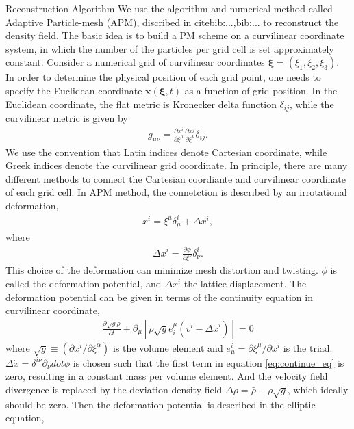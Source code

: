 \begin{section}{Reconstruction Algorithm}
  \label{sec:reconstruction}
    We use the algorithm and numerical method called Adaptive Particle-mesh (APM), discribed in citebib:...,bib:... to reconstruct the density field. The basic idea is to build a PM scheme on a curvilinear coordinate system, in which the number of the particles per grid cell is set approximately constant. 
    Consider a numerical grid of curvilinear coordinates $\bm{\xi}=\left(\xi_1,\xi_2,\xi_3\right)$. In order to determine the physical position of each grid point, one needs to specify the Euclidean coordinate $\bm{x}(\bm{\xi},t)$ as a function of grid position. In the Euclidean coordinate, the flat metric is Kronecker delta function $\delta_{ij}$, while the curvilinear metric is given by
\begin{align}
    g_{\mu\nu}=\frac{\partial x^i}{\partial \xi ^\mu} \frac{\partial x^j}{\partial \xi ^\nu}\delta_{ij}.
\end{align}
    We use the convention that Latin indices denote Cartesian coordinate, while Greek indices denote the curvilinear grid coordinate.
    In principle, there are many different methods to connect the Cartesian coordiante and curvilinear coordinate of each grid cell. In APM method, the connetction is described by an irrotational deformation,
\begin{align}
    x^i=\xi ^\mu \delta ^i _\mu + \Delta x^i,
\end{align}
where
\begin{align}
 \label{eq:disp}
    \Delta x^i=\frac{\partial \phi}{\partial \xi ^ \nu}\delta ^i _\nu .
\end{align}
    This choice of the deformation can minimize mesh distortion and twisting. $\phi$ is called the deformation potential, and $\Delta x^i$ the lattice displacement. The deformation potential can be given in terms of the continuity equation in curvilinear coordinate,
\begin{align}
 \label{eq:continue_eq}
    \frac{\partial \sqrt{g} \rho }{\partial t}+\partial_\mu \left[\rho \sqrt{g} e^\mu _i \left(v^i - \Delta \dot{x}^i \right) \right] =0
\end{align}
where $\sqrt{g} \equiv (\partial x^i / \partial \xi ^ \alpha)$ is the volume element and $e^i _\mu = \partial \xi ^\mu / \partial x^i$ is the triad. $\Delta \dot{x}=\delta ^{i\nu}\partial _\nu dot{\phi}$ is chosen such that the first term in equation \ref{eq:continue_eq} is zero, resulting in a constant mass per volume element. And the velocity field divergence is replaced by the deviation density field $\Delta \rho = \bar{\rho}-\rho \sqrt{g}$, which ideally should be zero. Then the deformation potential is described in the elliptic equation,

\end{section}
